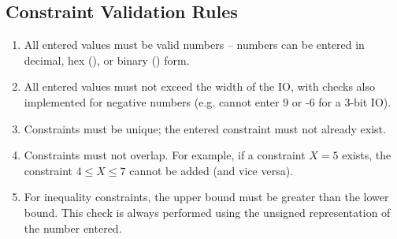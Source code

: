 \subsection{Constraint Validation Rules}
\begin{enumerate}
    \item All entered values must be valid numbers -- numbers can be entered in decimal, hex (), or binary () form.
    \item All entered values must not exceed the width of the IO, with checks also implemented for negative numbers (e.g. cannot enter 9 or -6 for a 3-bit IO).
    \item Constraints must be unique; the entered constraint must not already exist.
    \item Constraints must not overlap. For example, if a constraint $X=5$ exists, the constraint $4 \leq X \leq 7$ cannot be added (and vice versa).
    \item For inequality constraints, the upper bound must be greater than the lower bound. This check is always performed using the unsigned representation of the number entered.
\end{enumerate}





